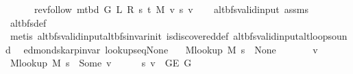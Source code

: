 \begin{isabellebody}
\ \ \ \ \ \ {\isacharparenleft}{\kern0pt}rev{\isacharunderscore}{\kern0pt}follow\ {\isacharparenleft}{\kern0pt}m{\isacharunderscore}{\kern0pt}tbd\ G\ L\ R\ s\ t\ M{\isacharparenright}{\kern0pt}\ v{\isacharparenright}{\kern0pt}\ s\ v{\isachardoublequoteclose}\isanewline
%
\isadelimproof
\ \ %
\endisadelimproof
%
\isatagproof
{}\isamarkupfalse%
\ alt{\isacharunderscore}{\kern0pt}bfs{\isacharunderscore}{\kern0pt}valid{\isacharunderscore}{\kern0pt}input\ assms\isanewline
\ \ \isamarkupfalse%
\ alt{\isacharunderscore}{\kern0pt}bfs{\isacharunderscore}{\kern0pt}def\isanewline
\ \ \isamarkupfalse%
\ {\isacharparenleft}{\kern0pt}metis\ alt{\isacharunderscore}{\kern0pt}bfs{\isacharunderscore}{\kern0pt}valid{\isacharunderscore}{\kern0pt}input{\isachardot}{\kern0pt}alt{\isacharunderscore}{\kern0pt}bfs{\isacharunderscore}{\kern0pt}invar{\isacharunderscore}{\kern0pt}init\ is{\isacharunderscore}{\kern0pt}discovered{\isacharunderscore}{\kern0pt}def\ alt{\isacharunderscore}{\kern0pt}bfs{\isacharunderscore}{\kern0pt}valid{\isacharunderscore}{\kern0pt}input{\isachardot}{\kern0pt}alt{\isacharunderscore}{\kern0pt}loop{\isacharunderscore}{\kern0pt}sound{\isacharparenright}{\kern0pt}%
\endisatagproof
{\isafoldproof}%
%
\isadelimproof
\isanewline
%
\endisadelimproof
%
\isadeliminvisible
\isanewline
%
\endisadeliminvisible
%
\isataginvisible
{}\isamarkupfalse%
\ {\isacharparenleft}{\kern0pt}\ edmonds{\isacharunderscore}{\kern0pt}karp{\isacharunderscore}{\kern0pt}invar{\isacharparenright}{\kern0pt}\ lookup{\isacharunderscore}{\kern0pt}s{\isacharunderscore}{\kern0pt}eq{\isacharunderscore}{\kern0pt}None{\isacharcolon}{\kern0pt}\isanewline
\ \ \ {\isachardoublequoteopen}M{\isacharunderscore}{\kern0pt}lookup\ M\ s\ {\isacharequal}{\kern0pt}\ None{\isachardoublequoteclose}%
\endisataginvisible
{\isafoldinvisible}%
%
\isadeliminvisible
\isanewline
%
\endisadeliminvisible
%
\isadelimproof
%
\endisadelimproof
%
\isatagproof
{}\isamarkupfalse%
\ {\isacharminus}{\kern0pt}\isanewline
\ \ \isacommand{{\isacharbraceleft}{\kern0pt}}\isamarkupfalse%
\ \isamarkupfalse%
\ v\isanewline
\ \ \ \ \isamarkupfalse%
\ {\isachardoublequoteopen}M{\isacharunderscore}{\kern0pt}lookup\ M\ s\ {\isacharequal}{\kern0pt}\ Some\ v{\isachardoublequoteclose}\isanewline
\ \ \ \ \isamarkupfalse%
\ {\isachardoublequoteopen}{\isacharbraceleft}{\kern0pt}s{\isacharcomma}{\kern0pt}\ v{\isacharbraceright}{\kern0pt}\ {\isasymin}\ G{\isachardot}{\kern0pt}E\ G{\isachardoublequoteclose}\isanewline

\end{isabellebody}
